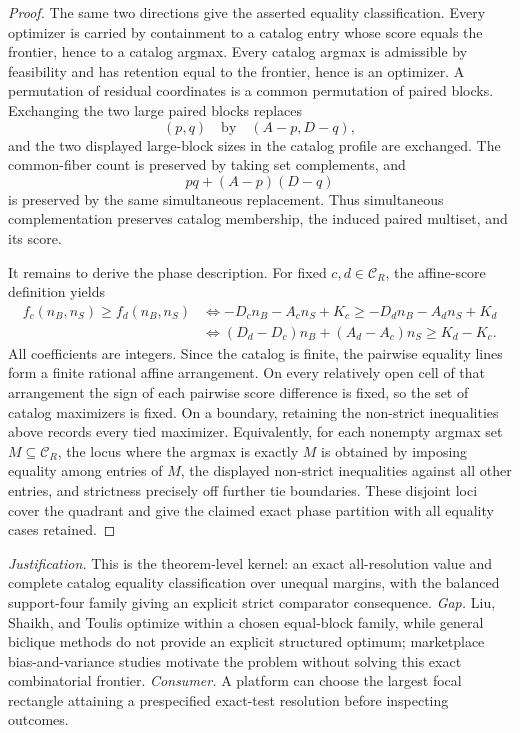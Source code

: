 \documentclass{article}
\begin{document}
\begin{proof}
The same two directions give the asserted equality classification. Every optimizer is carried by containment to a catalog entry whose score equals the frontier, hence to a catalog argmax. Every catalog argmax is admissible by feasibility and has retention equal to the frontier, hence is an optimizer. A permutation of residual coordinates is a common permutation of paired blocks. Exchanging the two large paired blocks replaces
\[
(p,q)\quad\text{by}\quad(A-p,D-q),
\]
and the two displayed large-block sizes in the catalog profile are exchanged. The common-fiber count is preserved by taking set complements, and
\[
pq+(A-p)(D-q)
\]
is preserved by the same simultaneous replacement. Thus simultaneous complementation preserves catalog membership, the induced paired multiset, and its score.

It remains to derive the phase description. For fixed \(c,d\in\mathcal C_R\), the affine-score definition yields
\[
\begin{aligned}
f_c(n_B,n_S)\ge f_d(n_B,n_S)
&\Longleftrightarrow
-D_cn_B-A_cn_S+K_c\ge-D_dn_B-A_dn_S+K_d\\
&\Longleftrightarrow
(D_d-D_c)n_B+(A_d-A_c)n_S\ge K_d-K_c.
\end{aligned}
\]
All coefficients are integers. Since the catalog is finite, the pairwise equality lines form a finite rational affine arrangement. On every relatively open cell of that arrangement the sign of each pairwise score difference is fixed, so the set of catalog maximizers is fixed. On a boundary, retaining the non-strict inequalities above records every tied maximizer. Equivalently, for each nonempty argmax set \(M\subseteq\mathcal C_R\), the locus where the argmax is exactly \(M\) is obtained by imposing equality among entries of \(M\), the displayed non-strict inequalities against all other entries, and strictness precisely off further tie boundaries. These disjoint loci cover the quadrant and give the claimed exact phase partition with all equality cases retained.
\end{proof}
\par\smallskip\noindent \textit{Justification.} This is the theorem-level kernel: an exact all-resolution value and complete catalog equality classification over unequal margins, with the balanced support-four family giving an explicit strict comparator consequence. \textit{Gap.} Liu, Shaikh, and Toulis optimize within a chosen equal-block family, while general biclique methods do not provide an explicit structured optimum; marketplace bias-and-variance studies motivate the problem without solving this exact combinatorial frontier. \textit{Consumer.} A platform can choose the largest focal rectangle attaining a prespecified exact-test resolution before inspecting outcomes.
\end{document}
